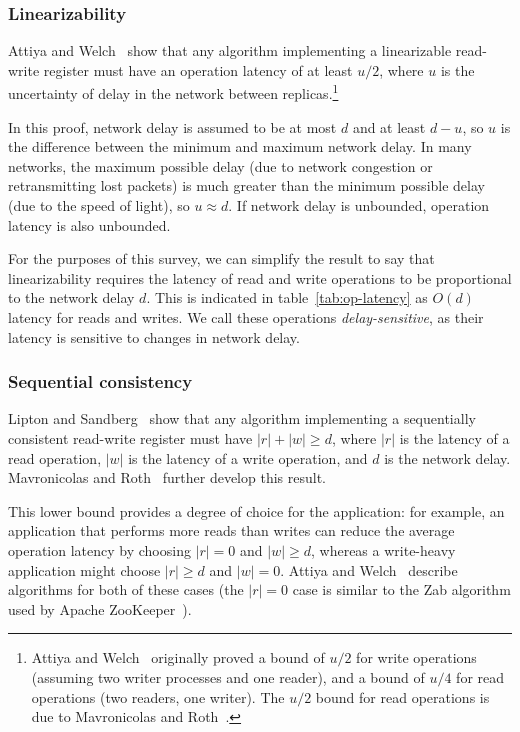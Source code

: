 \documentclass[a4paper,twocolumn,10pt]{article}
\begin{document}
\subsubsection{Linearizability}

Attiya and Welch~\cite{Attiya1994gw} show that any algorithm implementing a linearizable read-write
register must have an operation latency of at least $u/2$, where $u$ is the uncertainty of delay in
the network between replicas.\footnote{Attiya and Welch~\cite{Attiya1994gw} originally proved a
bound of $u/2$ for write operations (assuming two writer processes and one reader), and a bound of
$u/4$ for read operations (two readers, one writer). The $u/2$ bound for read operations is due to
Mavronicolas and Roth~\cite{Mavronicolas1999eb}.}

In this proof, network delay is assumed to be at most $d$ and at least $d-u$, so $u$ is the
difference between the minimum and maximum network delay. In many networks, the maximum possible
delay (due to network congestion or retransmitting lost packets) is much greater than the minimum
possible delay (due to the speed of light), so $u \approx d$. If network delay is unbounded,
operation latency is also unbounded.

For the purposes of this survey, we can simplify the result to say that linearizability requires the
latency of read and write operations to be proportional to the network delay $d$. This is indicated
in table~\ref{tab:op-latency} as $O(d)$ latency for reads and writes. We call these operations
\emph{delay-sensitive}, as their latency is sensitive to changes in network delay.

\subsubsection{Sequential consistency}

Lipton and Sandberg~\cite{Lipton1988uh} show that any algorithm implementing a sequentially
consistent read-write register must have $|r| + |w| \geq d$, where $|r|$ is the latency of a read
operation, $|w|$ is the latency of a write operation, and $d$ is the network delay. Mavronicolas
and Roth~\cite{Mavronicolas1999eb} further develop this result.

This lower bound provides a degree of choice for the application: for example, an application that
performs more reads than writes can reduce the average operation latency by choosing $|r| = 0$ and
$|w| \geq d$, whereas a write-heavy application might choose $|r| \geq d$ and $|w| = 0$. Attiya and
Welch~\cite{Attiya1994gw} describe algorithms for both of these cases (the $|r| = 0$ case is similar
to the Zab algorithm used by Apache ZooKeeper~\cite{Junqueira2011jc}).
\end{document}
